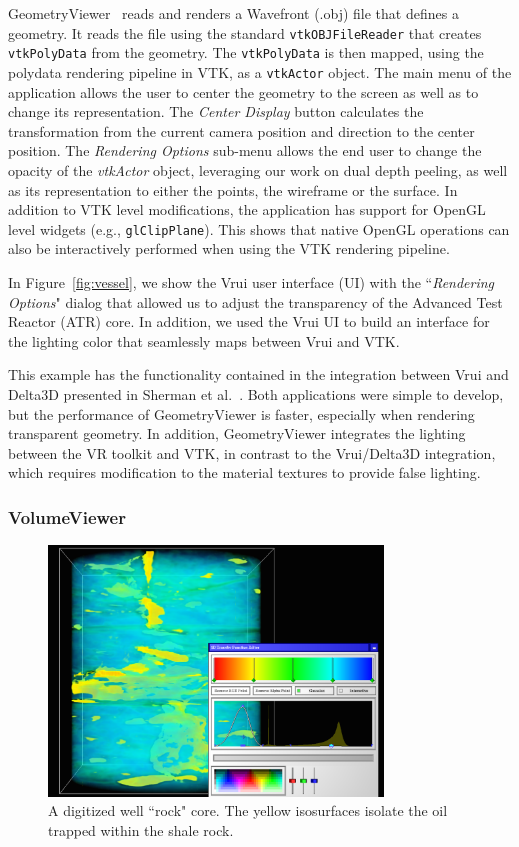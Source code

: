 GeometryViewer~\cite{GeometryViewer} reads and renders a Wavefront (.obj) file that defines a geometry.
It reads the file using the standard \texttt{vtkOBJFileReader} that creates \texttt{vtkPolyData} from the geometry.
The \texttt{vtkPolyData} is then mapped, using the polydata rendering pipeline in VTK, as a \texttt{vtkActor} object.
The main menu of the application allows the user to center the geometry to the screen as well as to change its representation.
The \textit{Center Display} button calculates the transformation from the current camera position and direction to the center position.
The \textit{Rendering Options} sub-menu allows the end user to change the opacity of the \textit{vtkActor} object, leveraging our work on dual depth peeling, as well as its representation to either the points, the wireframe or the surface.
In addition to VTK level modifications, the application has support for OpenGL level widgets (e.g., \texttt{glClipPlane}).
This shows that native OpenGL operations can also be interactively performed when using the VTK rendering pipeline.

In Figure~\ref{fig:vessel}, we show the Vrui user interface (UI) with the ``\textit{Rendering Options}" dialog that allowed us to adjust the transparency of the Advanced Test Reactor (ATR) core. In addition, we used the Vrui UI to build an interface for the lighting color that seamlessly maps between Vrui and VTK.

This example has the functionality contained in the integration between Vrui and Delta3D presented in Sherman et al.~\cite{Sherman:2010}. Both applications were simple to develop, but the performance of GeometryViewer is faster, especially when rendering transparent geometry. In addition, GeometryViewer integrates the lighting between the VR toolkit and VTK, in contrast to the Vrui/Delta3D integration, which requires modification to the material textures to provide false lighting.

\subsubsection{VolumeViewer}

\begin{figure}[h!]
 \centering
 \includegraphics[width=3.5in]{images/rock-transferfunction.png}
 \caption{A digitized well ``rock" core. The yellow isosurfaces isolate the oil trapped within the shale rock.}
 \label{fig:volume}
\end{figure}

